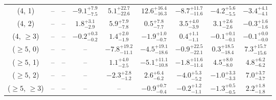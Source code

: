 \begin{table}[h!]
{\begin{tabular}{ccccccccc}
	(4, 1) & -- & -- & $-9.1^{+ 7.9 }_{- 7.5 }$ & $5.1^{+ 22.7 }_{- 22.6 }$ & $12.6^{+ 16.4 }_{- 16.3 }$ & $-8.7^{+ 11.7 }_{- 11.6 }$ & $-4.2^{+ 5.6 }_{- 5.5 }$ & $-3.4^{+ 4.1 }_{- 4.1 }$ \\[0.5ex] 
	(4, 2) & -- & -- & $1.8^{+ 3.1 }_{- 2.9 }$ & $5.9^{+ 7.9 }_{- 7.8 }$ & $0.5^{+ 7.8 }_{- 7.7 }$ & $3.5^{+ 4.0 }_{- 3.9 }$ & $3.1^{+ 2.6 }_{- 2.6 }$ & $-0.3^{+ 1.6 }_{- 1.6 }$ \\[0.5ex] 
	(4, $\ge3$) & -- & -- & $-0.2^{+ 0.3 }_{- 0.2 }$ & $1.4^{+ 2.0 }_{- 1.9 }$ & $-1.9^{+ 1.0 }_{- 0.7 }$ & $0.4^{+ 1.1 }_{- 1.1 }$ & $-0.1^{+ 0.1 }_{- 0.1 }$ & $-0.1^{+ 0.0 }_{- 0.0 }$ \\[0.5ex] 
	($\ge5$, 0) & -- & -- & -- & $-7.8^{+ 19.2 }_{- 11.1 }$ & $-4.5^{+ 19.1 }_{- 18.6 }$ & $-0.9^{+ 22.5 }_{- 22.1 }$ & $0.3^{+ 18.5 }_{- 18.4 }$ & $7.3^{+ 15.7 }_{- 15.6 }$ \\[0.5ex] 
	($\ge5$, 1) & -- & -- & -- & $1.1^{+ 4.0 }_{- 2.5 }$ & $-5.1^{+ 11.1 }_{- 10.8 }$ & $-1.8^{+ 11.6 }_{- 11.4 }$ & $4.5^{+ 8.0 }_{- 8.0 }$ & $4.8^{+ 6.2 }_{- 6.2 }$ \\[0.5ex] 
	($\ge5$, 2) & -- & -- & -- & $-2.3^{+ 2.8 }_{- 1.2 }$ & $2.6^{+ 6.4 }_{- 6.2 }$ & $-4.0^{+ 5.3 }_{- 5.2 }$ & $-1.0^{+ 3.3 }_{- 3.3 }$ & $7.0^{+ 3.7 }_{- 3.7 }$ \\[0.5ex] 
	($\ge5$, $\ge3$) & -- & -- & -- & -- & $-0.9^{+ 0.7 }_{- 0.4 }$ & $-0.2^{+ 1.2 }_{- 1.1 }$ & $-1.3^{+ 0.5 }_{- 0.5 }$ & $2.2^{+ 1.8 }_{- 1.8 }$ \\[0.5ex] 
	\hline
	\hline
\end{tabular}}
\end{table}
